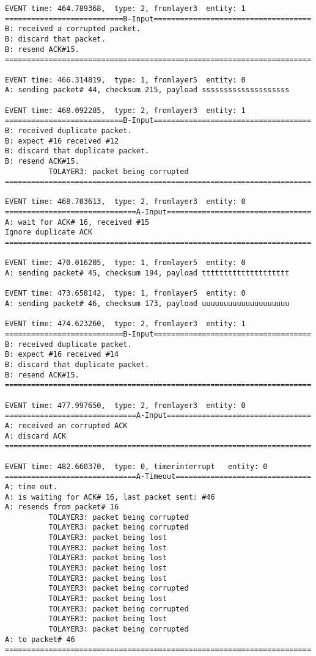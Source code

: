 \documentclass[12pt]{article}
\begin{document}
\begin{verbatim}
EVENT time: 464.789368,  type: 2, fromlayer3  entity: 1
===========================B-Input====================================
B: received a corrupted packet.
B: discard that packet.
B: resend ACK#15.
======================================================================

EVENT time: 466.314819,  type: 1, fromlayer5  entity: 0
A: sending packet# 44, checksum 215, payload ssssssssssssssssssss

EVENT time: 468.092285,  type: 2, fromlayer3  entity: 1
===========================B-Input====================================
B: received duplicate packet.
B: expect #16 received #12
B: discard that duplicate packet.
B: resend ACK#15.
          TOLAYER3: packet being corrupted
======================================================================

EVENT time: 468.703613,  type: 2, fromlayer3  entity: 0
==============================A-Input=================================
A: wait for ACK# 16, received #15
Ignore duplicate ACK
======================================================================

EVENT time: 470.016205,  type: 1, fromlayer5  entity: 0
A: sending packet# 45, checksum 194, payload tttttttttttttttttttt

EVENT time: 473.658142,  type: 1, fromlayer5  entity: 0
A: sending packet# 46, checksum 173, payload uuuuuuuuuuuuuuuuuuuu

EVENT time: 474.623260,  type: 2, fromlayer3  entity: 1
===========================B-Input====================================
B: received duplicate packet.
B: expect #16 received #14
B: discard that duplicate packet.
B: resend ACK#15.
======================================================================

EVENT time: 477.997650,  type: 2, fromlayer3  entity: 0
==============================A-Input=================================
A: received an corrupted ACK 
A: discard ACK
======================================================================

EVENT time: 482.660370,  type: 0, timerinterrupt   entity: 0
==============================A-Timeout===============================
A: time out. 
A: is waiting for ACK# 16, last packet sent: #46
A: resends from packet# 16 
          TOLAYER3: packet being corrupted
          TOLAYER3: packet being corrupted
          TOLAYER3: packet being lost
          TOLAYER3: packet being lost
          TOLAYER3: packet being lost
          TOLAYER3: packet being lost
          TOLAYER3: packet being lost
          TOLAYER3: packet being corrupted
          TOLAYER3: packet being lost
          TOLAYER3: packet being corrupted
          TOLAYER3: packet being lost
          TOLAYER3: packet being corrupted
A: to packet# 46
======================================================================


\end{verbatim}
\end{document}
